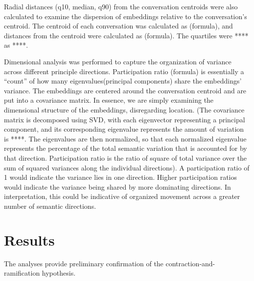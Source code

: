 \documentclass{article}
\begin{document}
Radial distances (q10, median, q90) from the conversation centroids were also calculated to examine the dispersion of embeddings relative to the conversation’s centroid. The centroid of each conversation was calculated as (formula), and distances from the centroid were calculated as (formula). The quartiles were **** as ****.

Dimensional analysis was performed to capture the organization of variance across different principle directions. Participation ratio (formula) is essentially a “count” of how many eigenvalues(principal components) share the embeddings’ variance. The embeddings are centered around the conversation centroid and are put into a covariance matrix. In essence, we are simply examining the dimensional structure of the embeddings, disregarding location. (The covariance matrix is decomposed using SVD, with each eigenvector representing a principal component, and its corresponding eigenvalue represents the amount of variation is ****. The eigenvalues are then normalized, so that each normalized eigenvalue represents the percentage of the total semantic variation that is accounted for by that direction. Participation ratio is the ratio of square of total variance over the sum of squared variances along the individual directions).  A participation ratio of 1 would indicate the variance lies in one direction. Higher participation ratios would indicate the variance being shared by more dominating directions. In interpretation, this could be indicative of organized movement across a greater number of semantic directions.

\section{Results}

The analyses provide preliminary confirmation of the contraction-and-ramification hypothesis.
\end{document}
